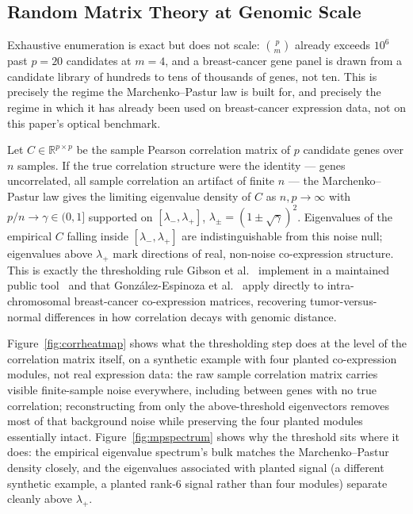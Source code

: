 \documentclass[11pt]{article}
\begin{document}
\subsection{Random Matrix Theory at Genomic Scale}
\label{sec:rmtgenomic}

Exhaustive enumeration is exact but does not scale: $\binom{p}{m}$ already exceeds $10^{6}$ past $p=20$ candidates at $m=4$, and a breast-cancer gene panel is drawn from a candidate library of hundreds to tens of thousands of genes, not ten. This is precisely the regime the Marchenko--Pastur law is built for, and precisely the regime in which it has already been used on breast-cancer expression data, not on this paper's optical benchmark.

Let $C\in\mathbb{R}^{p\times p}$ be the sample Pearson correlation matrix of $p$ candidate genes over $n$ samples. If the true correlation structure were the identity --- genes uncorrelated, all sample correlation an artifact of finite $n$ --- the Marchenko--Pastur law gives the limiting eigenvalue density of $C$ as $n,p\to\infty$ with $p/n\to\gamma\in(0,1]$ supported on $[\lambda_-,\lambda_+]$, $\lambda_\pm=(1\pm\sqrt\gamma)^2$. Eigenvalues of the empirical $C$ falling inside $[\lambda_-,\lambda_+]$ are indistinguishable from this noise null; eigenvalues above $\lambda_+$ mark directions of real, non-noise co-expression structure. This is exactly the thresholding rule Gibson et al.~\citep{ref47} implement in a maintained public tool~\citep{ref47code} and that Gonz\'{a}lez-Espinoza et al.~\citep{ref46} apply directly to intra-chromosomal breast-cancer co-expression matrices, recovering tumor-versus-normal differences in how correlation decays with genomic distance.

Figure~\ref{fig:corrheatmap} shows what the thresholding step does at the level of the correlation matrix itself, on a synthetic example with four planted co-expression modules, not real expression data: the raw sample correlation matrix carries visible finite-sample noise everywhere, including between genes with no true correlation; reconstructing from only the above-threshold eigenvectors removes most of that background noise while preserving the four planted modules essentially intact. Figure~\ref{fig:mpspectrum} shows why the threshold sits where it does: the empirical eigenvalue spectrum's bulk matches the Marchenko--Pastur density closely, and the eigenvalues associated with planted signal (a different synthetic example, a planted rank-6 signal rather than four modules) separate cleanly above $\lambda_+$.
\end{document}
